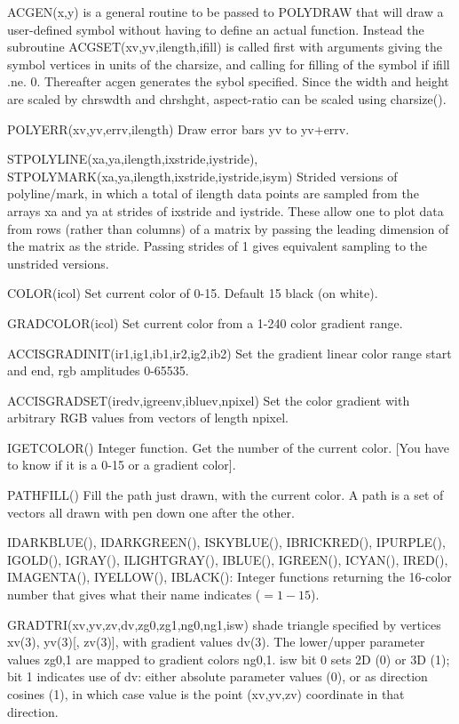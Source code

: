 ACGEN(x,y) is a general routine to be passed to POLYDRAW that will draw a
user-defined symbol without having to define an actual
function. Instead the subroutine ACGSET(xv,yv,ilength,ifill) is called
first with arguments giving the symbol vertices in units of the
charsize, and calling for filling of the symbol if ifill .ne. 0.
Thereafter acgen generates the sybol specified. Since the width and
height are scaled by chrswdth and chrshght, aspect-ratio can be scaled
using charsize().

POLYERR(xv,yv,errv,ilength) Draw error bars yv to yv+errv.

STPOLYLINE(xa,ya,ilength,ixstride,iystride),
STPOLYMARK(xa,ya,ilength,ixstride,iystride,isym) Strided versions of
polyline/mark, in which a total of ilength data points are sampled
from the arrays xa and ya at strides of ixstride and iystride. These
allow one to plot data from rows (rather than columns) of a matrix by
passing the leading dimension of the matrix as the stride. Passing
strides of 1 gives equivalent sampling to the unstrided versions.


\iftth {}\fi
COLOR(icol) Set current color of 0-15. Default 15 black (on white).

GRADCOLOR(icol) Set current color from a 1-240 color gradient range.

ACCISGRADINIT(ir1,ig1,ib1,ir2,ig2,ib2) Set the gradient linear color
range start and end, rgb amplitudes 0-65535.

ACCISGRADSET(iredv,igreenv,ibluev,npixel) Set the color gradient with
arbitrary RGB values from vectors of length npixel.

IGETCOLOR() Integer function.  Get the number of the current
color. [You have to know if it is a 0-15 or a gradient color].

PATHFILL() Fill the path just drawn, with the current color. A path is
a set of vectors all drawn with pen down one after the other.

IDARKBLUE(), IDARKGREEN(),  ISKYBLUE(),  IBRICKRED(),  IPURPLE(),
IGOLD(),  IGRAY(),  ILIGHTGRAY(),  IBLUE(),  IGREEN(),  ICYAN(),
IRED(),  IMAGENTA(),  IYELLOW(),  IBLACK(): Integer functions returning
the 16-color number that gives what their name indicates ($=1-15$).

GRADTRI(xv,yv,zv,dv,zg0,zg1,ng0,ng1,isw) shade triangle specified by
vertices xv(3), yv(3)[, zv(3)], with gradient values dv(3). The
lower/upper parameter values zg0,1 are mapped to gradient colors
ng0,1. isw bit 0 sets 2D (0) or 3D (1); bit 1 indicates use of dv:
either absolute parameter values (0), or as direction cosines (1), in
which case value is the point (xv,yv,zv) coordinate in that direction.

